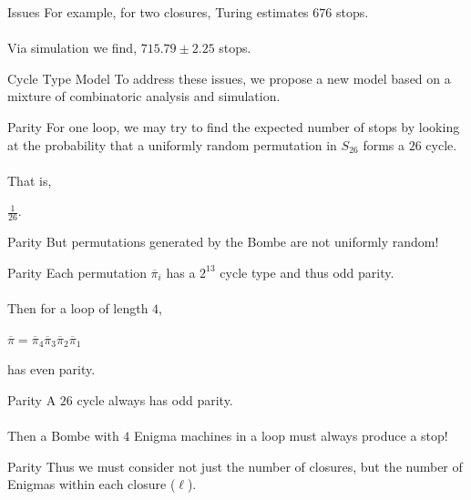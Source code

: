 \documentclass[hyphens,aspectratio=169]{beamer}
\begin{document}
\begin{frame}[fragile]{Issues}
	For example, for two closures, Turing estimates $676$ stops.
	\\\\Via simulation we find, $715.79\pm2.25$ stops.
\end{frame}

\begin{frame}[fragile]{Cycle Type Model}
	To address these issues, we propose a new model based on a mixture of combinatoric analysis and simulation.
\end{frame}

\begin{frame}[fragile]{Parity}
	For one loop, we may try to find the expected number of stops by looking at the probability that a uniformly random permutation in $S_{26}$ forms a $26$ cycle.
	\\\\That is, \begin{center}
		$\frac{1}{26}$.
	\end{center}
\end{frame}

\begin{frame}[fragile]{Parity}
	\large
	But permutations generated by the Bombe are not uniformly random!
\end{frame}

\begin{frame}[fragile]{Parity}
	Each permutation $\overline\pi_i$ has a
	$2^{13}$ cycle type and thus odd parity.
	\\\\Then for a loop of length $4$,
	\begin{center}
		$\overline\pi = \overline\pi_4\overline\pi_3\overline\pi_2\overline\pi_1$
	\end{center}
	has even parity.
\end{frame}

\begin{frame}[fragile]{Parity}
	\large
	A $26$ cycle always has odd parity.
	\\\\Then a Bombe with $4$ Enigma machines in a loop must always produce a stop!
\end{frame}

\begin{frame}[fragile]{Parity}
	\large
	Thus we must consider not just the number of closures, but the number of Enigmas within each closure ($\ell$).
\end{frame}
\end{document}
